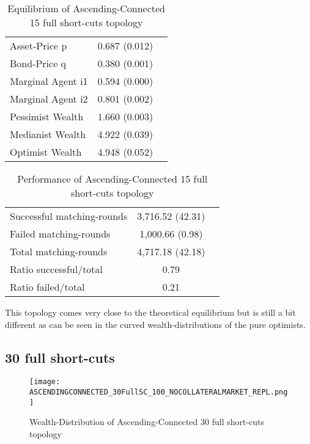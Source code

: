 \documentclass[Bachelorarbeit.tex]{subfiles}
\begin{document}
\begin{table}[H]
	\caption{Equilibrium of Ascending-Connected 15 full short-cuts topology}
	\centering
	\begin{tabular} { l c r }
		\hline
		Asset-Price p & 0.687 (0.012) \\
		Bond-Price q & 0.380 (0.001) \\
		Marginal Agent i1 & 0.594 (0.000) \\
		Marginal Agent i2 & 0.801 (0.002) \\
		\hline
		Pessimist Wealth & 1.660 (0.003) \\
		Medianist Wealth & 4.922 (0.039) \\
		Optimist Wealth & 4.948 (0.052) \\
		\hline
	\end{tabular}
\end{table} 

\begin{table}[H]
	\caption{Performance of Ascending-Connected 15 full short-cuts topology}
	\centering
	\begin{tabular} { l c r }
		\hline
		Successful matching-rounds & 3,716.52 (42.31) \\
		Failed matching-rounds & 1,000.66 (0.98) \\
		Total matching-rounds & 4,717.18 (42.18) \\
		\hline
		Ratio successful/total & 0.79 \\
		Ratio failed/total & 0.21 \\
		\hline
	\end{tabular}
\end{table}

This topology comes very close to the theoretical equilibrium but is still a bit different as can be seen in the curved wealth-distributions of the pure optimists.

\subsection{30 full short-cuts}
\begin{figure}[H]
	\centering
  \texttt{[image: ASCENDINGCONNECTED\_30FullSC\_100\_NOCOLLATERALMARKET\_REPL.png]}
	\caption{Wealth-Distribution of Ascending-Connected 30 full short-cuts topology}
	\label{fig:wealth_ASCENDINGCONNECTED_30FullSC_100_NOCOLLATERALMARKET_REPL}
\end{figure}
\end{document}

